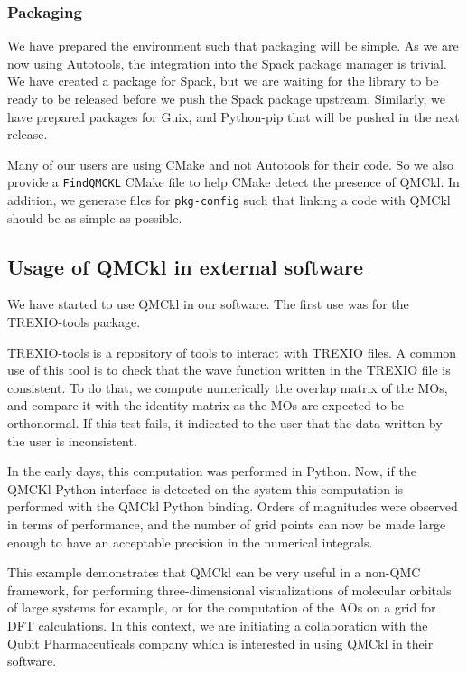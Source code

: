 \subsubsection{Packaging}

We have prepared the environment such that packaging will be
simple. As we are now using Autotools, the integration into the Spack
package manager is trivial. We have created a package for Spack, but
we are waiting for the library to be ready to be released before we
push the Spack package upstream.
Similarly, we have prepared packages for Guix, and Python-pip that
will be pushed in the next release.

Many of our users are using CMake and not Autotools for their code. So
we also provide a \texttt{FindQMCKL} CMake file to help CMake detect
the presence of QMCkl. In addition, we generate files for
\texttt{pkg-config} such that linking a code with QMCkl should be as
simple as possible.

\subsection{Usage of QMCkl in external software}

We have started to use QMCkl in our software. The first use was for
the TREXIO-tools package.

TREXIO-tools is a repository of tools to interact with TREXIO files. A
common use of this tool is to check that the wave function written in
the TREXIO file is consistent. To do that, we compute numerically the
overlap matrix of the \acp{MO}, and compare it with the identity
matrix as the \acp{MO} are expected to be orthonormal. If this test
fails, it indicated to the user that the data written by the user is
inconsistent.

In the early days, this computation was performed in Python. Now, if
the QMCKl Python interface is detected on the system this computation
is performed with the QMCkl Python binding. Orders of magnitudes were
observed in terms of performance, and the number of grid points can
now be made large enough to have an acceptable precision in the
numerical integrals.

This example demonstrates that QMCkl can be very useful in a non-QMC
framework, for performing three-dimensional visualizations of molecular
orbitals of large systems for example, or for the computation of the
\acp{AO} on a grid for \ac{DFT} calculations. In this context, we are
initiating a collaboration with the Qubit Pharmaceuticals company
which is interested in using QMCkl in their software.

